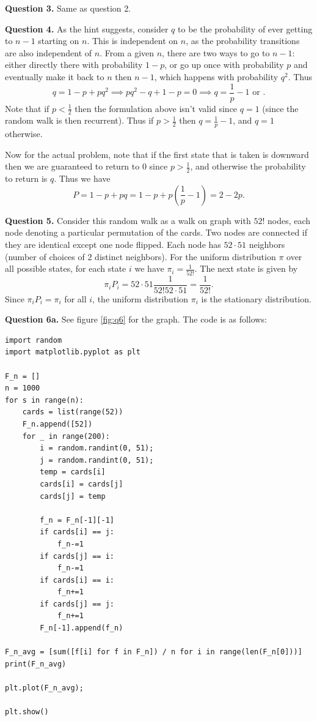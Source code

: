 \documentclass[letterpaper, reqno,11pt]{article}
\begin{document}
{\medskip\noindent\bf Question 3.} Same as question 2.

{\medskip\noindent\bf Question 4.} As the hint suggests, consider $q$ to be the probability of ever getting to $n-1$ starting on $n$. This is independent on $n$, as the probability transitions are also independent of $n$. From a given $n$, there are two ways to go to $n-1$: either directly there with probability $1-p$, or go up once with probability $p$ and eventually make it back to $n$ then $n-1$, which happens with probability $q^2$. Thus
\[
    q=1-p + pq^2\implies pq^2-q+1-p=0 \implies q=\frac{1}{p}-1\text{ or }
.\]
Note that if $p<\frac{1}{2}$ then the formulation above isn't valid since $q=1$ (since the random walk is then recurrent). Thus if $p>\frac{1}{2}$ then $q=\frac{1}{p}-1$, and $q=1$ otherwise.

Now for the actual problem, note that if the first state that is taken is downward then we are guaranteed to return to 0 since $p>\frac{1}{2}$, and otherwise the probability to return is $q$. Thus we have
\[
P=1-p+pq=1-p+p(\frac{1}{p}-1)=2-2p
.\]

{\medskip\noindent\bf Question 5.} Consider this random walk as a walk on graph with $52!$ nodes, each node denoting a particular permutation of the cards. Two nodes are connected if they are identical except one node flipped. Each node has $52\cdot 51$ neighbors (number of choices of 2 distinct neighbors). For the uniform distribution $\pi$ over all possible states, for each state $i$ we have $\pi_i=\frac{1}{52!}$. The next state is given by
\[
    \pi_{i}P_i=52\cdot 51 \frac{1}{52! 52\cdot 51}=\frac{1}{52!}
.\]
Since $\pi_iP_i=\pi_{i}$ for all $i$, the uniform distribution $\pi_i$ is the stationary distribution.

{\medskip\noindent\bf Question 6a.} See figure \ref{fig:q6} for the graph.  The code is as follows:

\begin{lstlisting}
import random
import matplotlib.pyplot as plt

F_n = []
n = 1000
for s in range(n):
    cards = list(range(52))
    F_n.append([52])
    for _ in range(200):
        i = random.randint(0, 51);
        j = random.randint(0, 51);
        temp = cards[i]
        cards[i] = cards[j]
        cards[j] = temp

        f_n = F_n[-1][-1]
        if cards[i] == j:
            f_n-=1
        if cards[j] == i:
            f_n-=1
        if cards[i] == i:
            f_n+=1
        if cards[j] == j:
            f_n+=1
        F_n[-1].append(f_n)

F_n_avg = [sum([f[i] for f in F_n]) / n for i in range(len(F_n[0]))]
print(F_n_avg)

plt.plot(F_n_avg);

plt.show()
\end{lstlisting}
\end{document}
